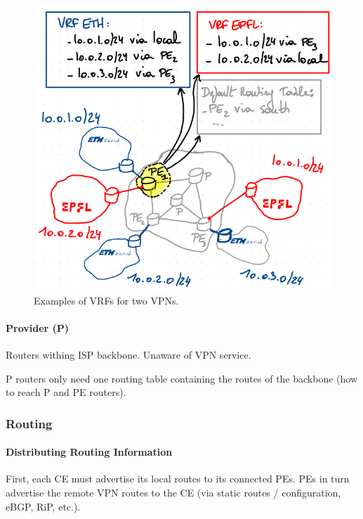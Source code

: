 \begin{figure}[h]
	\centering
	\includegraphics[scale=0.6]{images/3-vrf.PNG}
	\caption{Examples of VRFs for two VPNs.}
	\label{fig:vrf}
\end{figure}


\paragraph{Provider (P)}
Routers withing ISP backbone. Unaware of VPN service.

P routers only need one routing table containing the routes of the backbone (how to reach P and PE routers).


\subsubsection{Routing}


\paragraph{Distributing Routing Information}
First, each CE must advertise its local routes to its connected PEs. PEs in turn advertise the remote VPN routes to the CE (via static routes / configuration, eBGP, RiP, etc.).

